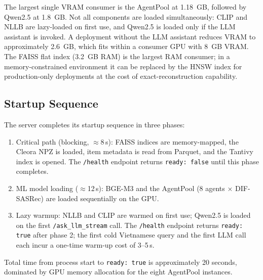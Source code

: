 The largest single VRAM consumer is the AgentPool at 1.18~GB, followed by Qwen2.5 at 1.8~GB.
Not all components are loaded simultaneously: CLIP and NLLB are lazy-loaded on first use, and Qwen2.5 is loaded only if the LLM assistant is invoked.
A deployment without the LLM assistant reduces VRAM to approximately 2.6~GB, which fits within a consumer GPU with 8~GB VRAM.
The FAISS flat index (3.2~GB RAM) is the largest RAM consumer; in a memory-constrained environment it can be replaced by the HNSW index for production-only deployments at the cost of exact-reconstruction capability.

\subsection{Startup Sequence}

The server completes its startup sequence in three phases:
\begin{enumerate}
    \item Critical path (blocking, $\approx$8\,s): FAISS indices are memory-mapped, the Cleora NPZ is loaded, item metadata is read from Parquet, and the Tantivy index is opened. The \texttt{/health} endpoint returns \texttt{ready: false} until this phase completes.
    \item ML model loading ($\approx$12\,s): BGE-M3 and the AgentPool (8 agents × DIF-SASRec) are loaded sequentially on the GPU.
    \item Lazy warmup: NLLB and CLIP are warmed on first use; Qwen2.5 is loaded on the first \texttt{/ask\_llm\_stream} call. The \texttt{/health} endpoint returns \texttt{ready: true} after phase 2; the first cold Vietnamese query and the first LLM call each incur a one-time warm-up cost of 3--5\,s.
\end{enumerate}
Total time from process start to \texttt{ready: true} is approximately 20 seconds, dominated by GPU memory allocation for the eight AgentPool instances.
